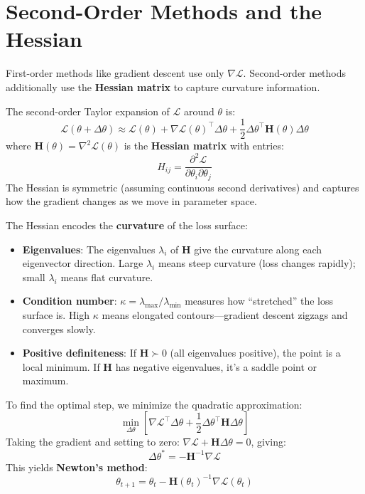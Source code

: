 \section{Second-Order Methods and the Hessian}

First-order methods like gradient descent use only $\nabla\mathcal{L}$. Second-order methods additionally use the \textbf{Hessian matrix} to capture curvature information.

\begin{definition}
    The second-order Taylor expansion of $\mathcal{L}$ around $\theta$ is:
    \[
        \mathcal{L}(\theta + \Delta\theta) \approx \mathcal{L}(\theta) + \nabla\mathcal{L}(\theta)^\top \Delta\theta + \frac{1}{2}\Delta\theta^\top \mathbf{H}(\theta) \Delta\theta
    \]
    where $\mathbf{H}(\theta) = \nabla^2\mathcal{L}(\theta)$ is the \textbf{Hessian matrix} with entries:
    \[
        H_{ij} = \frac{\partial^2 \mathcal{L}}{\partial \theta_i \partial \theta_j}
    \]
    The Hessian is symmetric (assuming continuous second derivatives) and captures how the gradient changes as we move in parameter space.
\end{definition}

\begin{remark}
    The Hessian encodes the \textbf{curvature} of the loss surface:
    \begin{itemize}
        \item \textbf{Eigenvalues}: The eigenvalues $\lambda_i$ of $\mathbf{H}$ give the curvature along each eigenvector direction. Large $\lambda_i$ means steep curvature (loss changes rapidly); small $\lambda_i$ means flat curvature.
        \item \textbf{Condition number}: $\kappa = \lambda_{\max}/\lambda_{\min}$ measures how ``stretched'' the loss surface is. High $\kappa$ means elongated contours---gradient descent zigzags and converges slowly.
        \item \textbf{Positive definiteness}: If $\mathbf{H} \succ 0$ (all eigenvalues positive), the point is a local minimum. If $\mathbf{H}$ has negative eigenvalues, it's a saddle point or maximum.
    \end{itemize}
\end{remark}

\begin{definition}
    To find the optimal step, we minimize the quadratic approximation:
    \[
        \min_{\Delta\theta} \left[ \nabla\mathcal{L}^\top \Delta\theta + \frac{1}{2}\Delta\theta^\top \mathbf{H} \Delta\theta \right]
    \]
    Taking the gradient and setting to zero: $\nabla\mathcal{L} + \mathbf{H}\Delta\theta = 0$, giving:
    \[
        \Delta\theta^* = -\mathbf{H}^{-1}\nabla\mathcal{L}
    \]
    This yields \textbf{Newton's method}:
    \[
        \theta_{t+1} = \theta_t - \mathbf{H}(\theta_t)^{-1} \nabla\mathcal{L}(\theta_t)
    \]
\end{definition}


